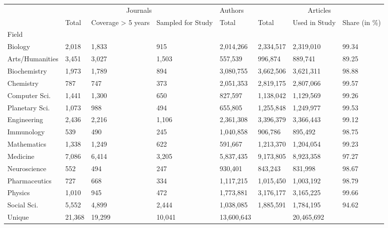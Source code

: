 \begin{tabular}{llllllll}
\toprule
{} & \multicolumn{3}{c}{Journals} &     Authors & \multicolumn{3}{c}{Articles} \\
{} &    Total & Coverage > 5 years & Sampled for Study &       Total &      Total & Used in Study & Share (in \%) \\
Field           &          &                    &                   &             &            &               &              \\
\midrule
Biology         &    2,018 &              1,833 &               915 &   2,014,266 &  2,334,517 &     2,319,010 &        99.34 \\
Arts/Humanities &    3,451 &              3,027 &             1,503 &     557,539 &    996,874 &       889,741 &        89.25 \\
Biochemistry    &    1,973 &              1,789 &               894 &   3,080,755 &  3,662,506 &     3,621,311 &        98.88 \\
Chemistry       &      787 &                747 &               373 &   2,051,353 &  2,819,175 &     2,807,066 &        99.57 \\
Computer Sci.   &    1,441 &              1,300 &               650 &     827,597 &  1,138,042 &     1,129,569 &        99.26 \\
Planetary Sci.  &    1,073 &                988 &               494 &     655,805 &  1,255,848 &     1,249,977 &        99.53 \\
Engineering     &    2,436 &              2,216 &             1,106 &   2,361,308 &  3,396,379 &     3,366,443 &        99.12 \\
Immunology      &      539 &                490 &               245 &   1,040,858 &    906,786 &       895,492 &        98.75 \\
Mathematics     &    1,338 &              1,249 &               622 &     591,667 &  1,213,370 &     1,204,054 &        99.23 \\
Medicine        &    7,086 &              6,414 &             3,205 &   5,837,435 &  9,173,805 &     8,923,358 &        97.27 \\
Neuroscience    &      552 &                494 &               247 &     930,401 &    843,243 &       831,998 &        98.67 \\
Pharmaceutics   &      727 &                668 &               334 &   1,117,215 &  1,015,450 &     1,003,192 &        98.79 \\
Physics         &    1,010 &                945 &               472 &   1,773,881 &  3,176,177 &     3,165,225 &        99.66 \\
Social Sci.     &    5,552 &              4,899 &             2,444 &   1,038,085 &  1,885,591 &     1,784,195 &        94.62 \\
Unique          &   21,368 &             19,299 &            10,041 &  13,600,643 &            &    20,465,692 &              \\
\bottomrule
\end{tabular}
